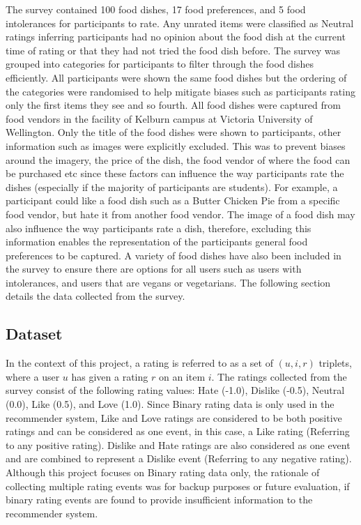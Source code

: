 The survey contained 100 food dishes, 17 food preferences, and 5 food intolerances for participants to rate. Any unrated items were classified as Neutral ratings inferring participants had no opinion about the food dish at the current time of rating or that they had not tried the food dish before. The survey was grouped into categories for participants to filter through the food dishes efficiently. All participants were shown the same food dishes but the ordering of the categories were randomised to help mitigate biases such as participants rating only the first items they see and so fourth. All food dishes were captured from food vendors in the facility of Kelburn campus at Victoria University of Wellington. Only the title of the food dishes were shown to participants, other information such as images were explicitly excluded. This was to prevent biases around the imagery, the price of the dish, the food vendor of where the food can be purchased etc since these factors can influence the way participants rate the dishes (especially if the majority of participants are students). For example, a participant could like a food dish such as a Butter Chicken Pie from a specific food vendor, but hate it from another food vendor. The image of a food dish may also influence the way participants rate a dish, therefore, excluding this information enables the representation of the participants general food preferences to be captured. A variety of food dishes have also been included in the survey to ensure there are options for all users such as users with intolerances, and users that are vegans or vegetarians. The following section details the data collected from the survey. 

\subsection{Dataset}

In the context of this project, a rating is referred to as a set of $(u, i, r)$ triplets, where a user $u$ has given a rating $r$ on an item $i$. 
The ratings collected from the survey consist of the following rating values: Hate (-1.0), Dislike (-0.5), Neutral (0.0), Like (0.5), and Love (1.0). Since Binary rating data is only used in the recommender system, Like and Love ratings are considered to be both positive ratings and can be considered as one event, in this case, a Like rating (Referring to any positive rating). Dislike and Hate ratings are also considered as one event and are combined to represent a Dislike event (Referring to any negative rating). Although this project focuses on Binary rating data only, the rationale of collecting multiple rating events was for backup purposes or future evaluation, if binary rating events are found to provide insufficient information to the recommender system. 

